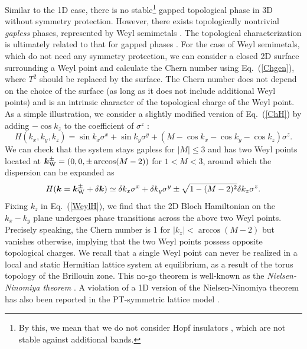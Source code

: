 \documentclass{tADP2e}
\theoremstyle{plain}
\theoremstyle{plain}
\theoremstyle{definition}
\begin{document}
Similar to the 1D case, there is no stable\footnote{By this, we mean that we do not consider Hopf insulators \cite{MJE08}, which are not stable against additional bands.} gapped topological phase in 3D without symmetry protection. However, there exists topologically nontrivial \emph{gapless} phases, represented by Weyl semimetals \cite{WX11}. The topological characterization is ultimately related to that for gapped phases \cite{SM13}. For the case of Weyl semimetals, which do not need any symmetry protection, we can consider a closed 2D surface surrounding a Weyl point and calculate the Chern number using Eq.~(\ref{Chgen}), where $T^2$ should be replaced by the surface. The Chern number does not depend on the choice of the surface (as long as it does not include additional Weyl points) and is an intrinsic character of the topological charge of the Weyl point. As a simple illustration, we consider a slightly modified version of Eq.~(\ref{ChH}) by adding $-\cos k_z$ to the coefficient of $\sigma^z$ \cite{ANP18}:
\begin{equation}
H(k_x,k_y,k_z)=\sin k_x\sigma^x+\sin k_y\sigma^y+(M-\cos k_x-\cos k_y-\cos k_z)\sigma^z.
\label{WeylH}
\end{equation}
We can check that the system stays gapless for $|M|\le3$ and has two Weyl points located at $\boldsymbol{k}^{\pm}_{\rm W}=(0,0,\pm\arccos (M-2))$ for $1<M<3$, around which the dispersion can be expanded as
\begin{equation}
H(\boldsymbol{k}=\boldsymbol{k}^{\pm}_{\rm W}+\delta\boldsymbol{k})\simeq \delta k_x\sigma^x+\delta k_y\sigma^y\pm\sqrt{1-(M-2)^2}\delta k_z\sigma^z.
\end{equation}
Fixing $k_z$ in Eq.~(\ref{WeylH}), we find that the 2D Bloch Hamiltonian on the $k_x-k_y$ plane undergoes phase transitions across the above two Weyl points. Precisely speaking, the Chern number is $1$ for $|k_z|<\arccos (M-2)$ but vanishes otherwise, implying that the two Weyl points possess opposite topological charges.  
We recall that a single Weyl point can never be realized in a local and static Hermitian lattice system at equilibrium, as a result of the torus topology of the Brillouin zone. This no-go theorem is well-known as the \emph{Nielsen-Ninomiya theorem} \cite{HBN81a,HBN81b}. A violation of a 1D version of the Nielsen-Ninomiya theorem has also been reported in the PT-symmetric lattice model \cite{Chernodub_2017}.
 
\end{document}
